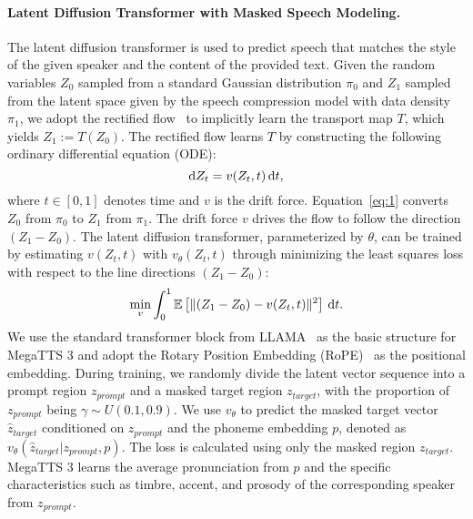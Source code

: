 \paragraph{Latent Diffusion Transformer with Masked Speech Modeling.}
The latent diffusion transformer is used to predict speech that matches the style of the given speaker and the content of the provided text. Given the random variables $Z_{0}$ sampled from a standard Gaussian distribution $\pi_{0}$ and $Z_{1}$ sampled from the latent space given by the speech compression model with data density $\pi_{1}$, we adopt the rectified flow~\citet{liu2022flow} to implicitly learn the transport map $T$, which yields $Z_{1} := T(Z_{0})$. The rectified flow learns $T$ by constructing the following ordinary differential equation (ODE):
\begin{equation}
    \small
    \mathrm{d}Z_t = v(Z_t, t)\,\mathrm{d}t,
    \label{eq:1}
\end{equation}
where $t\in[0,1]$ denotes time and $v$ is the drift force. Equation~\ref{eq:1} converts $Z_{0}$ from $\pi_{0}$ to $Z_{1}$ from $\pi_{1}$. The drift force $v$ drives the flow to follow the direction $(Z_{1}-Z_{0})$. The latent diffusion transformer,  parameterized by $\theta$, can be trained by estimating $v(Z_{t}, t)$ with $v_{\theta}(Z_{t}, t)$ through minimizing the least squares loss with respect to the line directions $(Z_{1}-Z_{0})$:
\begin{equation}
    \small
    \min_v \int_0^1 \mathbb{E} \left[ \| (Z_1 - Z_0) - v(Z_t, t) \|^2 \right] \, \mathrm{d}t.
    \label{eq:2}
\end{equation}
We use the standard transformer block from LLAMA~\citep{dubey2024llama} as the basic structure for MegaTTS 3 and adopt the Rotary Position Embedding (RoPE)~\citep{su2024roformer} as the positional embedding. During training, we randomly divide the latent vector sequence into a prompt region $z_{prompt}$ and a masked target region $z_{target}$, with the proportion of $z_{prompt}$ being $\gamma \sim U(0.1, 0.9)$. We use $v_{\theta}$ to predict the masked target vector $\hat{z}_{target}$ conditioned on $z_{prompt}$ and the phoneme embedding $p$, denoted as $v_{\theta}(\hat{z}_{target}|z_{prompt}, p)$. The loss is calculated using only the masked region $z_{target}$. MegaTTS 3 learns the average pronunciation from $p$ and the specific characteristics such as timbre, accent, and prosody of the corresponding speaker from $z_{prompt}$.



